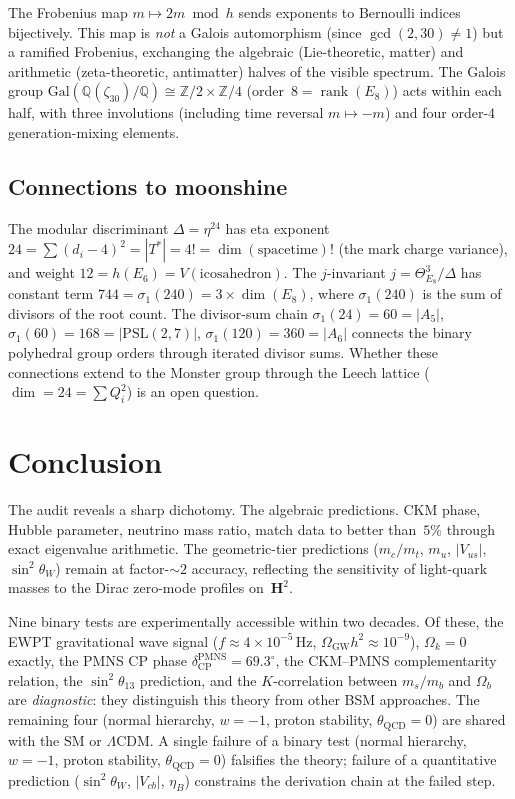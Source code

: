 The Frobenius map $m \mapsto 2m \bmod h$ sends exponents to
Bernoulli indices bijectively.  This map is \emph{not} a Galois
automorphism (since $\gcd(2,30) \neq 1$) but a ramified Frobenius,
exchanging the algebraic (Lie-theoretic, matter) and arithmetic
(zeta-theoretic, antimatter) halves of the visible spectrum.
The Galois group $\mathrm{Gal}(\mathbb{Q}(\zeta_{30})/\mathbb{Q})
\cong \mathbb{Z}/2 \times \mathbb{Z}/4$ (order~$8 = \operatorname{rank}(E_8)$)
acts within each half, with three involutions (including time reversal
$m \mapsto -m$) and four order-$4$ generation-mixing elements.

\subsection{Connections to moonshine}

The modular discriminant $\Delta = \eta^{24}$ has eta exponent
$24 = \sum(d_i - 4)^2 = |T^*| = 4! = \dim(\text{spacetime})!$
(the mark charge variance), and weight $12 = h(E_6) = V(\text{icosahedron})$.
The $j$-invariant $j = \Theta_{E_8}^3/\Delta$
has constant term $744 = \sigma_1(240) = 3 \times \dim(E_8)$,
where $\sigma_1(240)$ is the sum of divisors of the root count.
The divisor-sum chain
$\sigma_1(24) = 60 = |A_5|$,
$\sigma_1(60) = 168 = |\mathrm{PSL}(2,7)|$,
$\sigma_1(120) = 360 = |A_6|$
connects the binary polyhedral group orders through iterated
divisor sums.
Whether these connections extend to the Monster group through the
Leech lattice ($\dim = 24 = \sum Q_i^2$) is an open question.


\section{Conclusion}
\label{sec:conclusion}

The audit reveals a sharp dichotomy.
The algebraic predictions. CKM phase, Hubble parameter,
neutrino mass ratio, match data to better than~$5\%$
through exact eigenvalue arithmetic.
The geometric-tier predictions ($m_c/m_t$, $m_u$,
$|V_{us}|$, $\sin^2\theta_W$) remain at factor-${\sim}2$
accuracy, reflecting the sensitivity of light-quark masses
to the Dirac zero-mode profiles on~$\mathbf{H}^2$.

Nine binary tests are experimentally
accessible within two decades.
Of these, the EWPT gravitational wave signal
($f \approx 4 \times 10^{-5}$\,Hz,
$\Omega_{\mathrm{GW}} h^2 \approx 10^{-9}$),
$\Omega_k = 0$ exactly,
the PMNS CP phase $\delta_{\mathrm{CP}}^{\mathrm{PMNS}} = 69.3^\circ$,
the CKM--PMNS complementarity relation,
the $\sin^2\theta_{13}$ prediction,
and the $K$-correlation between $m_s/m_b$ and $\Omega_b$
are \emph{diagnostic}:
they distinguish this theory from other BSM approaches.
The remaining four (normal hierarchy, $w = -1$, proton
stability, $\theta_{\mathrm{QCD}} = 0$) are shared
with the SM or $\Lambda$CDM.
A single failure of a binary test (normal hierarchy,
$w = -1$, proton stability, $\theta_{\mathrm{QCD}} = 0$)
falsifies the theory;
failure of a quantitative prediction ($\sin^2\theta_W$,
$|V_{cb}|$, $\eta_B$) constrains the derivation chain
at the failed step.

